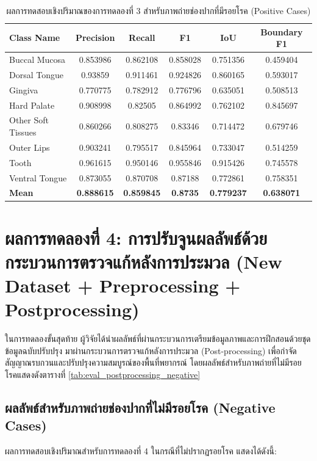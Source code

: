 \begin{table}[H]
\centering
\caption{ผลการทดสอบเชิงปริมาณของการทดลองที่ 3 สำหรับภาพถ่ายช่องปากที่มีรอยโรค (Positive Cases)}
\label{tab:eval_preprocessing_positive}
\begin{tabular}{|l|c|c|c|c|c|}
\hline
\textbf{Class Name} & \textbf{Precision} & \textbf{Recall} & \textbf{F1} & \textbf{IoU} & \textbf{Boundary F1} \\ \hline
Buccal Mucosa & 0.853986 & 0.862108 & 0.858028 & 0.751356 & 0.459404 \\
Dorsal Tongue & 0.93859 & 0.911461 & 0.924826 & 0.860165 & 0.593017 \\
Gingiva & 0.770775 & 0.782912 & 0.776796 & 0.635051 & 0.508513 \\
Hard Palate & 0.908998 & 0.82505 & 0.864992 & 0.762102 & 0.845697 \\
Other Soft Tissues & 0.860266 & 0.808275 & 0.83346 & 0.714472 & 0.679746 \\
Outer Lips & 0.903241 & 0.795517 & 0.845964 & 0.733047 & 0.514259 \\
Tooth & 0.961615 & 0.950146 & 0.955846 & 0.915426 & 0.745578 \\
Ventral Tongue & 0.873055 & 0.870708 & 0.87188 & 0.772861 & 0.758351 \\ \hline
\textbf{Mean} & \textbf{0.888615} & \textbf{0.859845} & \textbf{0.8735} & \textbf{0.779237} & \textbf{0.638071} \\ \hline
\end{tabular}
\end{table}

\section{ผลการทดลองที่ 4: การปรับจูนผลลัพธ์ด้วยกระบวนการตรวจแก้หลังการประมวล (New Dataset + Preprocessing + Postprocessing)}
ในการทดลองขั้นสุดท้าย ผู้วิจัยได้นำผลลัพธ์ที่ผ่านกระบวนการเตรียมข้อมูลภาพและการฝึกสอนด้วยชุดข้อมูลฉบับปรับปรุง มาผ่านกระบวนการตรวจแก้หลังการประมวล (Post-processing) เพื่อกำจัดสัญญาณรบกวนและปรับปรุงความสมบูรณ์ของพื้นที่พยากรณ์ โดยผลลัพธ์สำหรับภาพถ่ายที่ไม่มีรอยโรคแสดงดังตารางที่ \ref{tab:eval_postprocessing_negative}

\subsection{ผลลัพธ์สำหรับภาพถ่ายช่องปากที่ไม่มีรอยโรค (Negative Cases)}
ผลการทดสอบเชิงปริมาณสำหรับการทดลองที่ 4 ในกรณีที่ไม่ปรากฏรอยโรค แสดงได้ดังนี้:


